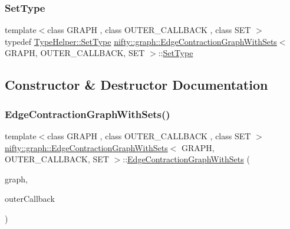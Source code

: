 \subsubsection{\texorpdfstring{Set\+Type}{SetType}}
{\footnotesize\ttfamily template$<$class G\+R\+A\+PH , class O\+U\+T\+E\+R\+\_\+\+C\+A\+L\+L\+B\+A\+CK , class S\+ET $>$ \\
typedef \hyperlink{structnifty_1_1graph_1_1EdgeContractionGraphWithSetsHelper_acc1b924a2b02648491b614c8d69ca9fb}{Type\+Helper\+::\+Set\+Type} \hyperlink{classnifty_1_1graph_1_1EdgeContractionGraphWithSets}{nifty\+::graph\+::\+Edge\+Contraction\+Graph\+With\+Sets}$<$ G\+R\+A\+PH, O\+U\+T\+E\+R\+\_\+\+C\+A\+L\+L\+B\+A\+CK, S\+ET $>$\+::\hyperlink{classnifty_1_1graph_1_1EdgeContractionGraphWithSets_aeb3c8839879c1e126ceaca6bdfdff008}{Set\+Type}}



\subsection{Constructor \& Destructor Documentation}
\mbox{\label{classnifty_1_1graph_1_1EdgeContractionGraphWithSets_a7ccb1db6a954ebcd7d4e56b150812ca2}} 
\subsubsection{\texorpdfstring{Edge\+Contraction\+Graph\+With\+Sets()}{EdgeContractionGraphWithSets()}}
{\footnotesize\ttfamily template$<$class G\+R\+A\+PH , class O\+U\+T\+E\+R\+\_\+\+C\+A\+L\+L\+B\+A\+CK , class S\+ET $>$ \\
\hyperlink{classnifty_1_1graph_1_1EdgeContractionGraphWithSets}{nifty\+::graph\+::\+Edge\+Contraction\+Graph\+With\+Sets}$<$ G\+R\+A\+PH, O\+U\+T\+E\+R\+\_\+\+C\+A\+L\+L\+B\+A\+CK, S\+ET $>$\+::\hyperlink{classnifty_1_1graph_1_1EdgeContractionGraphWithSets}{Edge\+Contraction\+Graph\+With\+Sets} (\begin{DoxyParamCaption}\item[{const \hyperlink{classnifty_1_1graph_1_1EdgeContractionGraphWithSets_abadbbebcd10e37a1a3f59bb967accdf0}{Graph\+Type} \&}]{graph,  }\item[{\hyperlink{classnifty_1_1graph_1_1EdgeContractionGraphWithSets_a2f741cfabfa1fb4c5bfc75df557c1d12}{Outer\+Callback\+Type} \&}]{outer\+Callback }\end{DoxyParamCaption})\hspace{0.3cm}{\ttfamily [inline]}}



